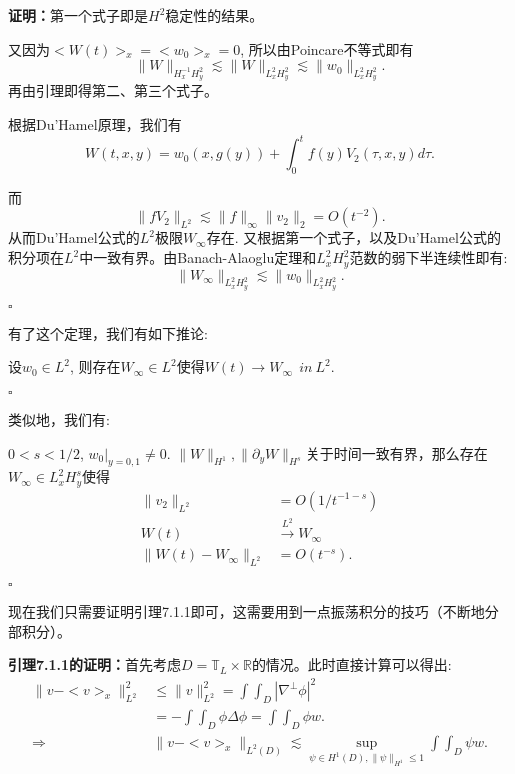 \textbf{证明：}第一个式子即是$H^2$稳定性的结果。

又因为$<W(t)>_x=<w_0>_x=0$, 所以由Poincare不等式即有$$\|W\|_{H_x^{-1}H_y^2}\lesssim\|W\|_{L_x^2H_y^2}\lesssim\|w_0\|_{L_x^2H_y^2}.$$ 再由引理即得第二、第三个式子。

根据Du'Hamel原理，我们有$$W(t,x,y)=w_0(x,g(y))+\int_0^tf(y)V_2(\tau,x,y)d\tau.$$

而$$\|fV_2\|_{L^2}\lesssim\|f\|_{\infty}\|v_2\|_{2}=O(t^{-2}).$$ 从而Du'Hamel公式的$L^2$极限$W_{\infty}$存在. 又根据第一个式子，以及Du'Hamel公式的积分项在$L^2$中一致有界。由Banach-Alaoglu定理和$L_x^2H_y^2$范数的弱下半连续性即有:$$\|W_{\infty}\|_{L_x^2H_y^2}\lesssim\|w_0\|_{L_x^2H_y^2}.$$
\begin{flushright}
$\square$
\end{flushright}

有了这个定理，我们有如下推论:

\begin{cor}\songti\rm 
设$w_0\in L^2$, 则存在$W_{\infty}\in L^2$使得$W(t)\rightarrow W_{\infty}~~in~L^2.$
\end{cor}
\begin{flushright}
$\square$
\end{flushright}

类似地，我们有:

\begin{cor}\songti \rm
$0<s<1/2$, $w_0|_{y=0,1}\neq 0.$ $\|W\|_{H^1},\|\partial_y W\|_{H^s}$关于时间一致有界，那么存在$W_{\infty}\in L_x^2H_y^s$使得
\[
\begin{aligned}
\|v_2\|_{L^2}&=O(1/t^{-1-s}) \\
W(t)&\xrightarrow{L^2}W_{\infty} \\
\|W(t)-W_{\infty}\|_{L^2}&=O(t^{-s}).
\end{aligned}
\]
\end{cor}
\begin{flushright}
$\square$
\end{flushright}

现在我们只需要证明引理7.1.1即可，这需要用到一点振荡积分的技巧（不断地分部积分）。

\textbf{引理7.1.1的证明：}首先考虑$D=\mathbb{T}_L\times\mathbb{R}$的情况。此时直接计算可以得出:
\begin{equation}
\begin{aligned}
\|v-<v>_x\|_{L^2}^2&\leq\|v\|_{L^2}^2=\int\int_{D}|\nabla^{\perp}\phi|^2 \\
&=-\int\int_{D}\phi\Delta\phi=\int\int_D\phi w.\\
\Rightarrow & \|v-<v>_x\|_{L^2(D)}\lesssim\sup_{\psi\in H^1(D), \|\psi\|_{H^1}\leq 1}\int\int_D\psi w.
\end{aligned}
\end{equation}

